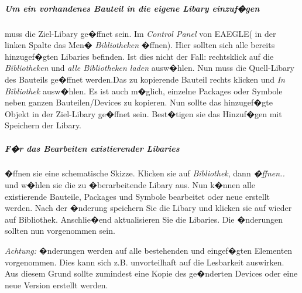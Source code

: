 \subparagraph{Um ein vorhandenes Bauteil in die eigene Libary einzuf�gen} muss die Ziel-Libary ge�ffnet sein. Im \textit{Control Panel} von EAEGLE( in der linken Spalte das Men� \textit{Bibliotheken} �ffnen). Hier sollten sich alle bereits hinzugef�gten Libaries befinden. Ist dies nicht der Fall: rechtsklick auf die \textit{Bibliotheken} und  \textit{alle Bibliotheken laden} ausw�hlen. Nun muss die Quell-Libary des Bauteils ge�ffnet werden.Das zu kopierende Bauteil rechts klicken und \textit{In Bibliothek} ausw�hlen. Es ist auch m�glich, einzelne Packages oder Symbole neben ganzen Bauteilen/Devices zu kopieren. Nun sollte das hinzugef�gte Objekt in der Ziel-Libary ge�ffnet sein. Best�tigen sie das Hinzuf�gen mit Speichern der Libary.

\subparagraph{F�r das Bearbeiten existierender Libaries} �ffnen sie eine schematische Skizze. Klicken sie auf \textit{Bibliothek}, dann \textit{�ffnen..} und w�hlen sie die zu �berarbeitende Libary aus. Nun k�nnen alle existierende Bauteile, Packages und Symbole bearbeitet oder neue erstellt werden.
Nach der �nderung speichern Sie die Libary und klicken sie auf wieder auf Bibliothek. Anschlie�end aktualisieren Sie die Libaries. Die �nderungen sollten nun vorgenommen sein.

\textit{Achtung:} �nderungen werden auf alle bestehenden und eingef�gten Elementen vorgenommen. Dies kann sich z.B. unvorteilhaft auf die Lesbarkeit auswirken. Aus diesem Grund sollte zumindest eine Kopie des ge�nderten Devices oder eine neue Version erstellt werden. 

